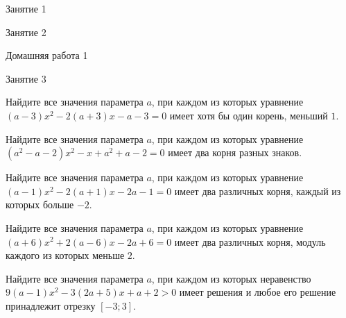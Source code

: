 %
%

\begin{class}[number=1]
	\begin{listofex}
		\item Занятие 1
	\end{listofex}
\end{class}

\begin{class}[number=2]
	\begin{listofex}
		\item Занятие 2
	\end{listofex}
\end{class}

\begin{homework}[number=1]
	\begin{listofex}
		\item Домашняя работа 1
	\end{listofex}
\end{homework}

\begin{class}[number=3]
	\begin{listofex}
		\item Занятие 3 
	\end{listofex}
\end{class}

\begin{class}[number=4]
	\begin{listofex}
		\item Найдите все значения параметра \(a\), при каждом из которых уравнение \( (a-3)x^2 - 2(a+3)x - a - 3 = 0 \) имеет хотя бы один корень, меньший \(1\).
		\item Найдите все значения параметра \(a\), при каждом из которых уравнение \( (a^2-a-2)x^2 - x + a^2 + a -2 = 0 \) имеет два корня разных знаков.
		\item Найдите все значения параметра \(a\), при каждом из которых уравнение \( (a-1)x^2 - 2(a+1)x-2a-1=0 \) имеет два различных корня, каждый из которых больше \(-2\).
		\item Найдите все значения параметра \(a\), при каждом из которых уравнение \( (a+6)x^2 +2(a-6)x-2a+6=0 \) имеет два различных корня, модуль каждого из которых меньше \(2\).
		\item Найдите все значения параметра \(a\), при каждом из которых неравенство \( 9(a-1)x^2-3(2a+5)x+a+2>0 \) имеет решения и любое его решение принадлежит отрезку \([-3;3]\).
	\end{listofex}
\end{class}

